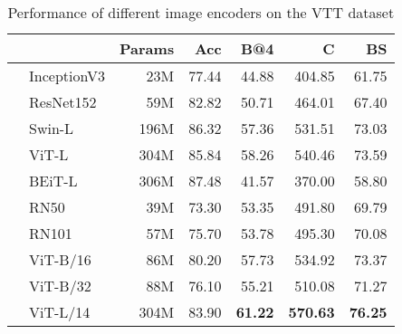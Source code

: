 \begin{table}[ht]
\centering
\small
\caption{Performance of different image encoders on the VTT dataset}
\label{tab:image_encoder}
\begin{tabular}{llrr|rrr}
\toprule
 &  & Params & Acc & B@4 & C & BS \\
\midrule
{} & InceptionV3 & 23M & 77.44 & 44.88 & 404.85 & 61.75 \\
 & ResNet152 & 59M & 82.82 & 50.71 & 464.01 & 67.40 \\
 & Swin-L & 196M & 86.32 & 57.36 & 531.51 & 73.03 \\
 & ViT-L & 304M & 85.84 & 58.26 & 540.46 & 73.59 \\
 & BEiT-L & 306M & 87.48 & 41.57 & 370.00 & 58.80 \\
 & RN50 & 39M & 73.30 & 53.35 & 491.80 & 69.79 \\
 & RN101 & 57M & 75.70 & 53.78 & 495.30 & 70.08 \\
 & ViT-B/16 & 86M & 80.20 & 57.73 & 534.92 & 73.37 \\
 & ViT-B/32 & 88M & 76.10 & 55.21 & 510.08 & 71.27 \\
 & ViT-L/14 & 304M & 83.90 & \textbf{61.22} & \textbf{570.63} & \textbf{76.25} \\
\bottomrule
\end{tabular}
\end{table}
